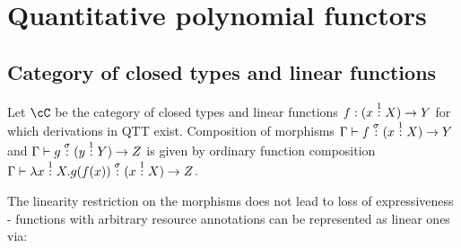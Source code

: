 \documentclass[12pt,a4paper]{article}
\begin{document}

\section{Quantitative polynomial functors}
\subsection{Category of closed types and linear functions}
Let $\cC$ be the category of closed types and linear functions $f : (x \overset{1}{:} X) \to Y $ for which derivations in QTT exist. Composition of morphisms $\Gamma \vdash f \overset{\sigma}{:} (x \overset{1}{:} X) \to Y$ and $\Gamma \vdash g \overset{\sigma}{:} (y \overset{1}{:} Y) \to Z$ is given by ordinary function composition $\Gamma \vdash \lambda x \overset{1}{:} X. g(f(x)) \overset{\sigma}{:} (x \overset{1}{:} X) \to Z $.

The linearity restriction on the morphisms does not lead to loss of expressiveness - functions with arbitrary resource annotations can be represented as linear ones via:
\end{document}
